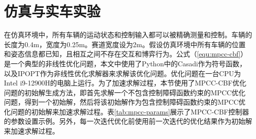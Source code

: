 \section{仿真与实车实验}
在仿真环境中，所有车辆的运动状态和控制输入都可以被精确测量和控制。车辆的长度为0.4m，宽度为0.25m。赛道宽度设为2m。假设仿真环境中所有车辆的位置和姿态信息都已知，且相互之间不存在交互和博弈行为。公式（\ref{equ:mpcc-cbf}）是一个典型的非线性优化问题，本文中使用了Python中的Casadi\cite{andersson2018casadi}作为符号函数，以及IPOPT\cite{biegler2009large}作为非线性优化求解器来求解该优化问题。优化问题在一台CPU为Intel i9-12900H的电脑上运行。为了加速求解过程，本节使用了MPCC-CBF优化问题的初始解生成方法，即首先求解一个不包含控制障碍函数约束的MPCC优化问题，得到一个初始解，然后将该初始解作为包含控制障碍函数约束的MPCC优化问题的初始解来加速求解过程。表\ref{tab:mpcc-params}展示了MPCC-CBF控制器的参数设置示例。另外，每一次迭代优化前使用前一次迭代的优化结果作为初始解来加速求解过程。
\begin{table}[h]
    \caption{\label{tab:mpcc-params}MPCC-CBF控制器参数}
    \renewcommand\arraystretch{1.25}
\end{table}
